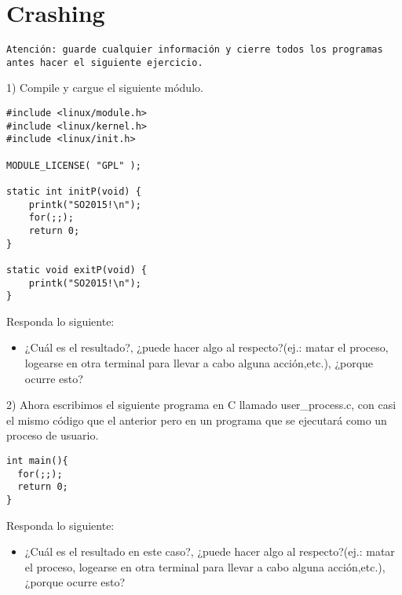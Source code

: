 \section{Crashing}

\texttt{Atención: guarde cualquier información y cierre todos los programas antes hacer el siguiente ejercicio.}


1) Compile  y cargue el siguiente módulo.

\begin{verbatim}
#include <linux/module.h>
#include <linux/kernel.h>
#include <linux/init.h>

MODULE_LICENSE( "GPL" );

static int initP(void) {
    printk("SO2015!\n");
    for(;;);
    return 0;
}

static void exitP(void) {
    printk("SO2015!\n");
}
\end{verbatim}

Responda lo siguiente:
\begin{itemize}  
\item ¿Cuál es el resultado?, ¿puede hacer algo al respecto?(ej.: matar el proceso, logearse en otra terminal para llevar a cabo alguna acción,etc.),  ¿porque ocurre esto?
\end{itemize}  

2) Ahora escribimos el siguiente programa en C llamado user\_process.c, con casi el mismo código que el anterior pero en un programa que se ejecutará como un proceso de usuario.

\begin{verbatim}
int main(){
  for(;;);
  return 0;
}
\end{verbatim}

Responda lo siguiente:
\begin{itemize}  
\item ¿Cuál es el resultado en este caso?, ¿puede hacer algo al respecto?(ej.: matar el proceso, logearse en otra terminal para llevar a cabo alguna acción,etc.),  ¿porque ocurre esto? 
\end{itemize}  


